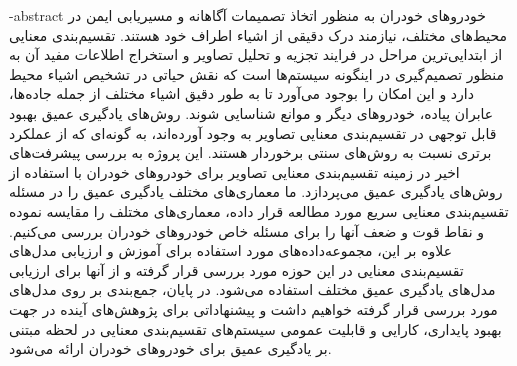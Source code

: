 \department{}


\fa-abstract{
خودروهای خودران
به منظور اتخاذ تصمیمات آگاهانه و مسیریابی ایمن در محیط‌های مختلف، نیازمند درک دقیقی از اشیاء اطراف خود هستند. تقسیم‌بندی معنایی
از ابتدایی‌ترین مراحل در فرایند تجزیه و تحلیل تصاویر و استخراج اطلاعات مفید آن به منظور تصمیم‌گیری در اینگونه سیستم‌ها است که نقش حیاتی در تشخیص اشیاء محیط دارد و این امکان را بوجود می‌آورد تا به طور دقیق اشیاء مختلف از جمله جاده‌ها، عابران پیاده، خودروهای دیگر و موانع شناسایی شوند. روش‌های یادگیری عمیق
بهبود قابل توجهی در تقسیم‌بندی معنایی تصاویر به وجود آورده‌اند، به گونه‌ای که از عملکرد برتری نسبت به روش‌های سنتی برخوردار هستند. این پروژه به بررسی پیشرفت‌های اخیر در زمینه تقسیم‌بندی معنایی تصاویر برای خودروهای خودران با استفاده از روش‌های یادگیری عمیق می‌پردازد. ما معماری‌های مختلف یادگیری عمیق را در مسئله تقسیم‌بندی معنایی سریع
مورد مطالعه قرار داده، معماری‌های مختلف را مقایسه نموده و نقاط قوت و ضعف آنها را برای مسئله خاص خودروهای خودران بررسی می‌کنیم. علاوه بر این، مجموعه‌داده‌های مورد استفاده برای آموزش و ارزیابی مدل‌های تقسیم‌بندی معنایی در این حوزه مورد بررسی قرار گرفته و از آنها برای ارزیابی مدل‌های یادگیری عمیق مختلف استفاده می‌شود. در پایان، جمع‌بندی بر روی مدل‌های مورد بررسی قرار گرفته خواهیم داشت و پیشنهاداتی برای پژوهش‌های آینده در جهت بهبود پایداری، کارایی و قابلیت عمومی سیستم‌های تقسیم‌بندی معنایی در لحظه مبتنی بر یادگیری عمیق برای خودروهای خودران ارائه می‌شود.
}

